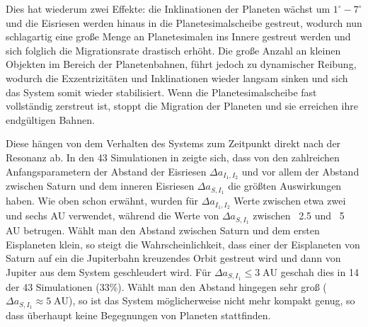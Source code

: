 \documentclass[10pt,a4paper,twoside]{article}
\begin{document}
Dies hat wiederum zwei Effekte: die Inklinationen der Planeten wächst um $1^\circ-7^\circ$ und die Eisriesen werden hinaus in die Planetesimalscheibe gestreut,
wodurch nun schlagartig eine große Menge an Planetesimalen ins Innere gestreut werden und sich folglich die Migrationsrate drastisch erhöht\cite{Tsiganis2005}.
Die große Anzahl an kleinen Objekten im Bereich der Planetenbahnen, führt jedoch zu dynamischer Reibung, wodurch die Exzentrizitäten und Inklinationen wieder langsam sinken und sich das System somit wieder stabilisiert\cite{Tsiganis2005}.
Wenn die Planetesimalscheibe fast vollständig zerstreut ist, stoppt die Migration der Planeten und sie erreichen ihre endgültigen Bahnen\cite{Tsiganis2005}.

\newcommand{\AU}{\;\mathrm{AU}}
\newcommand{\DII}{\Delta a_{I_1,I_2}}
\newcommand{\DSI}{\Delta a_{S,I_1}} %
Diese hängen von dem Verhalten des Systems zum Zeitpunkt direkt nach der Resonanz ab. In den 43 Simulationen in \cite{Tsiganis2005} zeigte sich, dass von den zahlreichen Anfangsparametern der Abstand der Eisriesen $\DII$ und vor allem der Abstand zwischen Saturn und dem inneren Eisriesen $\DSI$ die größten Auswirkungen haben\cite{Tsiganis2005}. %
Wie oben schon erwähnt, wurden für $\DII$ Werte zwischen etwa zwei und sechs AU verwendet, während die Werte von $\DSI$ zwischen ~2.5 und ~5 AU betrugen\cite{Tsiganis2005}.
Wählt man den Abstand zwischen Saturn und dem ersten Eisplaneten klein, so steigt die Wahrscheinlichkeit, dass einer der Eisplaneten von Saturn auf ein die Jupiterbahn kreuzendes Orbit gestreut wird und dann von Jupiter aus dem System geschleudert wird. Für $\DSI \le 3 \AU $ geschah dies in 14 der 43 Simulationen (33\%).
Wählt man den Abstand hingegen sehr groß ($\DSI \approx 5 \AU$), so ist das System möglicherweise nicht mehr kompakt genug, so dass überhaupt keine Begegnungen von Planeten stattfinden. %
\end{document}
